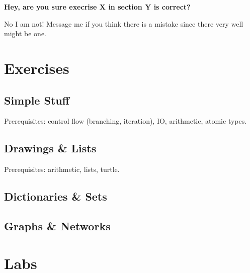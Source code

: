 \begin{flushleft}
\textbf{Hey, are you sure execrise X in section Y is correct?}
\end{flushleft}
\begin{flushright}
No I am not! Message me if you think there is a mistake since there very well might be one.
\end{flushright}

\tableofcontents

\section{Exercises}

    \subsection{Simple Stuff}
    Prerequisites: control flow (branching, iteration), IO, arithmetic, atomic types.
    

    \subsection{Drawings \& Lists}
    Prerequisites:   arithmetic, lists, turtle.
    

    \subsection{Dictionaries \& Sets}

    \subsection{Graphs \& Networks}

\section{Labs}
    


\clearpage
\doclicenseThis


